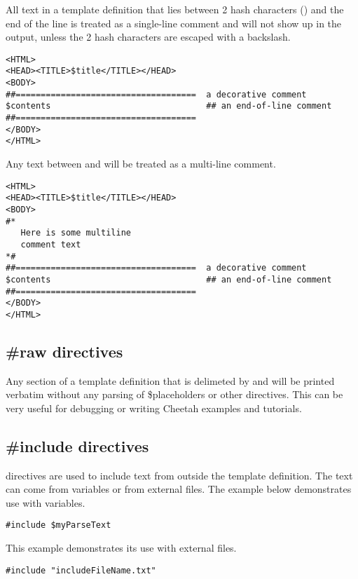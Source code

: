 All text in a template definition that lies between 2 hash characters
(\code{\#\#}) and the end of the line is treated as a single-line comment and
will not show up in the output, unless the 2 hash characters are escaped with a
backslash.
\begin{verbatim}
<HTML>
<HEAD><TITLE>$title</TITLE></HEAD>
<BODY>
##====================================  a decorative comment
$contents                               ## an end-of-line comment
##====================================
</BODY>
</HTML>
\end{verbatim}

Any text between \code{\#*} and \code{*\#} will be treated as a multi-line
comment.
\begin{verbatim}
<HTML>
<HEAD><TITLE>$title</TITLE></HEAD>
<BODY>
#*
   Here is some multiline
   comment text
*#
##====================================  a decorative comment
$contents                               ## an end-of-line comment
##====================================
</BODY>
</HTML>
\end{verbatim}

\subsection{\#raw directives}
Any section of a template definition that is delimeted by  and
 will be printed verbatim without any parsing of
\$placeholders or other directives.  This can be very useful for debugging or
writing Cheetah examples and tutorials.

\subsection{\#include directives}

 directives are used to include text from outside the template
definition.  The text can come from  variables or from
external files.  The example below demonstrates use with 
variables.

\begin{verbatim}
#include $myParseText
\end{verbatim}

This example demonstrates its use with external files.
\begin{verbatim}
#include "includeFileName.txt"
\end{verbatim}

